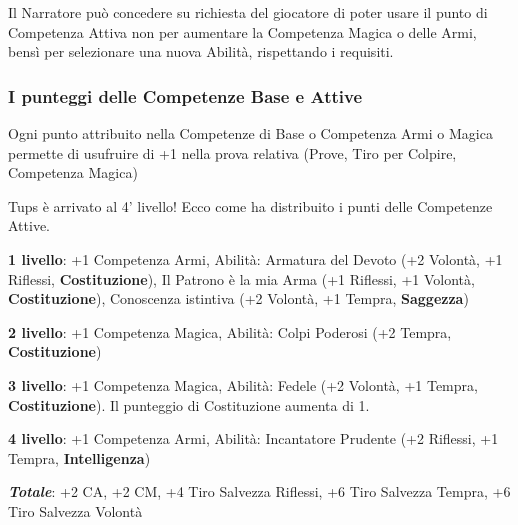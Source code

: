 \begin{multicols}{2}
Il Narratore può concedere su richiesta del giocatore di poter usare il punto di Competenza Attiva non per aumentare la Competenza Magica o delle Armi, bensì per selezionare una nuova Abilità, rispettando i requisiti.

\subsubsection{I punteggi delle Competenze Base e Attive}\label{punteggicompetenzebaseattive}

Ogni punto attribuito nella Competenze di Base o Competenza Armi o Magica permette di usufruire di +1 nella prova relativa (Prove, Tiro per Colpire, Competenza Magica)

\end{multicols}

\vspace{2cm}

\begin{changemargin}{0.3cm}{0.3cm}\begin{tcolorbox}[title = Tups arriva al 4' livello!]
Tups è arrivato al 4' livello! Ecco come ha distribuito i punti delle Competenze Attive.

\textbf{1 livello}: +1 Competenza Armi, Abilità: Armatura del Devoto (+2 Volontà, +1 Riflessi, \textbf{Costituzione}), Il Patrono è la mia Arma (+1 Riflessi, +1 Volontà, \textbf{Costituzione}), Conoscenza istintiva (+2 Volontà, +1 Tempra, \textbf{Saggezza})

\textbf{2 livello}: +1 Competenza Magica, Abilità: Colpi Poderosi (+2 Tempra, \textbf{Costituzione})

\textbf{3 livello}: +1 Competenza Magica, Abilità: Fedele (+2 Volontà, +1 Tempra, \textbf{Costituzione}). Il punteggio di Costituzione aumenta di 1.

\textbf{4 livello}: +1 Competenza Armi, Abilità: Incantatore Prudente (+2 Riflessi, +1 Tempra, \textbf{Intelligenza})

\textbf{\emph{Totale}}: +2 CA, +2 CM, +4 Tiro Salvezza Riflessi, +6 Tiro Salvezza Tempra, +6 Tiro Salvezza Volontà

\end{tcolorbox}\end{changemargin}



\vfill

